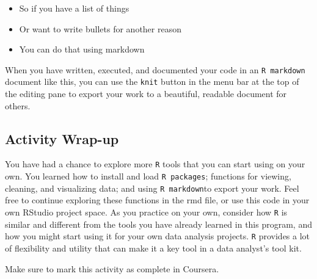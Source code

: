 \documentclass[
]{article}
\providecommand{\tightlist}{%
  \setlength{\itemsep}{0pt}\setlength{\parskip}{0pt}}
\begin{document}
\begin{itemize}
\tightlist
\item
  So if you have a list of things
\item
  Or want to write bullets for another reason
\item
  You can do that using markdown
\end{itemize}

When you have written, executed, and documented your code in an
\texttt{R\ markdown} document like this, you can use the \texttt{knit}
button in the menu bar at the top of the editing pane to export your
work to a beautiful, readable document for others.

\hypertarget{activity-wrap-up}{%
\subsection{Activity Wrap-up}\label{activity-wrap-up}}

You have had a chance to explore more \texttt{R} tools that you can
start using on your own. You learned how to install and load
\texttt{R\ packages}; functions for viewing, cleaning, and visualizing
data; and using \texttt{R\ markdown}to export your work. Feel free to
continue exploring these functions in the rmd file, or use this code in
your own RStudio project space. As you practice on your own, consider
how \texttt{R} is similar and different from the tools you have already
learned in this program, and how you might start using it for your own
data analysis projects. \texttt{R} provides a lot of flexibility and
utility that can make it a key tool in a data analyst's tool kit.

Make sure to mark this activity as complete in Coursera.
\end{document}
